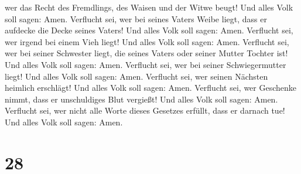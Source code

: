 wer das Recht des Fremdlings, des Waisen und der Witwe beugt! Und alles
Volk soll sagen: Amen.  Verflucht sei, wer bei seines
Vaters Weibe liegt, dass er aufdecke die Decke seines Vaters! Und alles
Volk soll sagen: Amen.  Verflucht sei, wer irgend bei
einem Vieh liegt! Und alles Volk soll sagen: Amen. 
Verflucht sei, wer bei seiner Schwester liegt, die seines Vaters oder
seiner Mutter Tochter ist! Und alles Volk soll sagen: Amen.
 Verflucht sei, wer bei seiner Schwiegermutter liegt! Und
alles Volk soll sagen: Amen.  Verflucht sei, wer seinen
Nächsten heimlich erschlägt! Und alles Volk soll sagen: Amen.
 Verflucht sei, wer Geschenke nimmt, dass er unschuldiges
Blut vergießt! Und alles Volk soll sagen: Amen. 
Verflucht sei, wer nicht alle Worte dieses Gesetzes erfüllt, dass er
darnach tue! Und alles Volk soll sagen: Amen.

\hypertarget{section-27}{%
\section{28}\label{section-27}}

